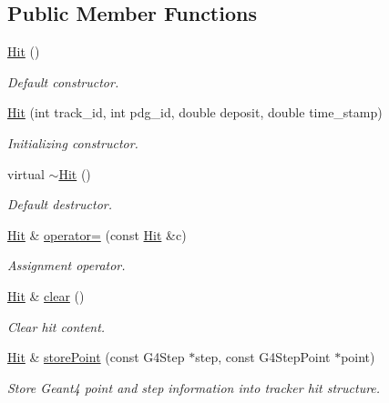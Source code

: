 \subsection*{Public Member Functions}
\begin{DoxyCompactItemize}
\item 
\hyperlink{class_d_d4hep_1_1_simulation_1_1_geant4_tracker_1_1_hit_a0a9d1a37e9de22e048ad01d09abeea3a}{Hit} ()
\begin{DoxyCompactList}\small\item\em Default constructor. \end{DoxyCompactList}\item 
\hyperlink{class_d_d4hep_1_1_simulation_1_1_geant4_tracker_1_1_hit_a2f02d476b53ca077e7bb1326e99a4267}{Hit} (int track\+\_\+id, int pdg\+\_\+id, double deposit, double time\+\_\+stamp)
\begin{DoxyCompactList}\small\item\em Initializing constructor. \end{DoxyCompactList}\item 
virtual \hyperlink{class_d_d4hep_1_1_simulation_1_1_geant4_tracker_1_1_hit_ad443787a7dd9e83a0b93248f823b375d}{$\sim$\+Hit} ()
\begin{DoxyCompactList}\small\item\em Default destructor. \end{DoxyCompactList}\item 
\hyperlink{class_d_d4hep_1_1_simulation_1_1_geant4_tracker_1_1_hit}{Hit} \& \hyperlink{class_d_d4hep_1_1_simulation_1_1_geant4_tracker_1_1_hit_a97a85ebcb7994f55275d4479ca5c4a6a}{operator=} (const \hyperlink{class_d_d4hep_1_1_simulation_1_1_geant4_tracker_1_1_hit}{Hit} \&c)
\begin{DoxyCompactList}\small\item\em Assignment operator. \end{DoxyCompactList}\item 
\hyperlink{class_d_d4hep_1_1_simulation_1_1_geant4_tracker_1_1_hit}{Hit} \& \hyperlink{class_d_d4hep_1_1_simulation_1_1_geant4_tracker_1_1_hit_aafcd9c0b786c16d9db3de2de661c9200}{clear} ()
\begin{DoxyCompactList}\small\item\em Clear hit content. \end{DoxyCompactList}\item 
\hyperlink{class_d_d4hep_1_1_simulation_1_1_geant4_tracker_1_1_hit}{Hit} \& \hyperlink{class_d_d4hep_1_1_simulation_1_1_geant4_tracker_1_1_hit_a8f2563ce396b2d2f7f6c6534aed3cdb4}{store\+Point} (const G4\+Step $\ast$step, const G4\+Step\+Point $\ast$point)
\begin{DoxyCompactList}\small\item\em Store Geant4 point and step information into tracker hit structure. \end{DoxyCompactList}\end{DoxyCompactItemize}
